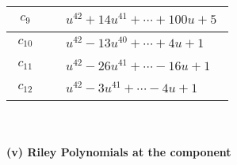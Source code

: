 \documentclass[1p]{elsarticle_modified}
\theoremstyle{definition}
\begin{document}
\begin{tabular}{m{50pt}|m{274pt}}
\hline $$\begin{aligned}c_{9}\end{aligned}$$&$\begin{aligned}
&u^{42}+14 u^{41}+\cdots+100 u+5
\end{aligned}$\\
\hline $$\begin{aligned}c_{10}\end{aligned}$$&$\begin{aligned}
&u^{42}-13 u^{40}+\cdots+4 u+1
\end{aligned}$\\
\hline $$\begin{aligned}c_{11}\end{aligned}$$&$\begin{aligned}
&u^{42}-26 u^{41}+\cdots-16 u+1
\end{aligned}$\\
\hline $$\begin{aligned}c_{12}\end{aligned}$$&$\begin{aligned}
&u^{42}-3 u^{41}+\cdots-4 u+1
\end{aligned}$\\
\hline
\end{tabular}\\~\\
\newpage\renewcommand{\arraystretch}{1}
\flushleft \textbf{(v) Riley Polynomials at the component}\newline \\
\end{document}
